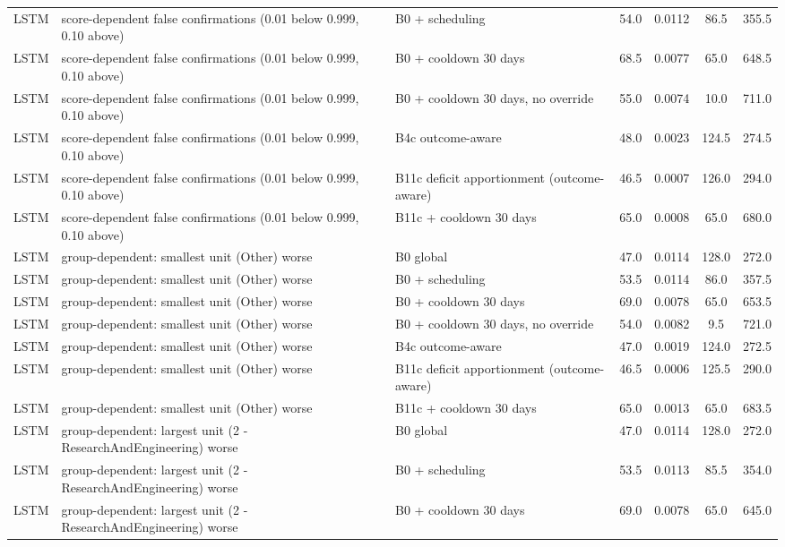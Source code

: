 \documentclass[10pt,onecolumn,letterpaper]{article}
\begin{document}
\begin{longtable}{lp{5.2cm}p{4.4cm}cccc}
LSTM & score-dependent false confirmations (0.01 below 0.999, 0.10 above) & B0 + scheduling & 54.0 & 0.0112 & 86.5 & 355.5 \\
LSTM & score-dependent false confirmations (0.01 below 0.999, 0.10 above) & B0 + cooldown 30 days & 68.5 & 0.0077 & 65.0 & 648.5 \\
LSTM & score-dependent false confirmations (0.01 below 0.999, 0.10 above) & B0 + cooldown 30 days, no override & 55.0 & 0.0074 & 10.0 & 711.0 \\
LSTM & score-dependent false confirmations (0.01 below 0.999, 0.10 above) & B4c outcome-aware & 48.0 & 0.0023 & 124.5 & 274.5 \\
LSTM & score-dependent false confirmations (0.01 below 0.999, 0.10 above) & B11c deficit apportionment (outcome-aware) & 46.5 & 0.0007 & 126.0 & 294.0 \\
LSTM & score-dependent false confirmations (0.01 below 0.999, 0.10 above) & B11c + cooldown 30 days & 65.0 & 0.0008 & 65.0 & 680.0 \\
LSTM & group-dependent: smallest unit (Other) worse & B0 global & 47.0 & 0.0114 & 128.0 & 272.0 \\
LSTM & group-dependent: smallest unit (Other) worse & B0 + scheduling & 53.5 & 0.0114 & 86.0 & 357.5 \\
LSTM & group-dependent: smallest unit (Other) worse & B0 + cooldown 30 days & 69.0 & 0.0078 & 65.0 & 653.5 \\
LSTM & group-dependent: smallest unit (Other) worse & B0 + cooldown 30 days, no override & 54.0 & 0.0082 & 9.5 & 721.0 \\
LSTM & group-dependent: smallest unit (Other) worse & B4c outcome-aware & 47.0 & 0.0019 & 124.0 & 272.5 \\
LSTM & group-dependent: smallest unit (Other) worse & B11c deficit apportionment (outcome-aware) & 46.5 & 0.0006 & 125.5 & 290.0 \\
LSTM & group-dependent: smallest unit (Other) worse & B11c + cooldown 30 days & 65.0 & 0.0013 & 65.0 & 683.5 \\
LSTM & group-dependent: largest unit (2 - ResearchAndEngineering) worse & B0 global & 47.0 & 0.0114 & 128.0 & 272.0 \\
LSTM & group-dependent: largest unit (2 - ResearchAndEngineering) worse & B0 + scheduling & 53.5 & 0.0113 & 85.5 & 354.0 \\
LSTM & group-dependent: largest unit (2 - ResearchAndEngineering) worse & B0 + cooldown 30 days & 69.0 & 0.0078 & 65.0 & 645.0 \\

\end{longtable}
\end{document}
